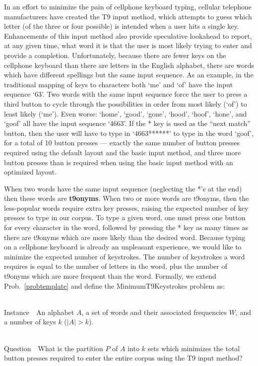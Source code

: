 \documentclass[runningheads]{llncs}
\newcommand{\newword}[1]{{\bf #1}}
\newcommand{\Instance}{{\sc Instance~}}
\newcommand{\Question}{~\\
{\sc Question~}}
\begin{document}
In an effort to minimize the pain of cellphone keyboard typing, cellular
telephone manufacturers have created the T9 input method, which attempts to
guess which letter (of the three or four possible) is intended when a user hits
a single key.  Enhancements of this input method also provide speculative
lookahead to report, at any given time, what word it is that the user is most
likely trying to enter and provide a completion.  Unfortunately, because there
are fewer keys on the cellphone keyboard than there are letters in the English
alphabet, there are words which have different spellings but the same input
sequence.  As an example, in the traditional mapping of keys to characters both
`me' and `of' have the input sequence `63'.  Two words with the same input
sequence force the user to press a third button to cycle through the
possibilities in order from most likely (`of') to least likely (`me').  Even
worse: `home', `good', `gone', `hood', `hoof', `hone', and `goof' all have the
input sequence `4663'.  If the * key is used as the ``next match'' button, then
the user will have to type in `4663******' to type in the word `goof',
for a total of 10 button presses --- exactly the same number of button presses
required using the default layout and the basic input method, and three more
button presses than is required when using the basic input method with an
optimized layout.

When two words have the same input sequence (neglecting the *'s at the end)
then these words are \newword{t9onyms}.  When two or more words are t9onyms,
then the less-popular words require extra key presses, raising the expected
number of key presses to type in our corpus.  To type a given word, one
must press one button for every character in the word, followed by pressing
the * key as many times as there are t9onyms which are more likely than the
desired word.  Because typing on a cellphone keyboard is already an unpleasant
experience, we would like to minimize the expected number of keystrokes.  The
number of keystrokes a word requires is equal to the number of letters in the
word, plus the number of t9onyms which are more frequent than the word.
Formally, we extend Prob.~\ref{probtemplate} and define the {\sc
MinimumT9Keystrokes} problem as:

\begin{prob}~\\
\label{thm:minstrokes}
\Instance\ An alphabet $A$, a set of words and their associated frequencies
$W$, and a number of keys $k$ ($|A| > k$).

\Question\ What is the partition $P$ of $A$ into $k$ sets which minimizes the
total button presses required to enter the entire corpus using the T9 input
method?
\end{prob}
\end{document}
